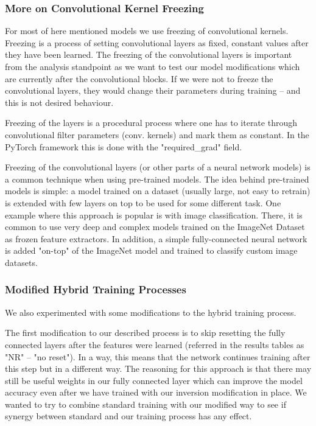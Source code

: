 \documentclass[b5paper]{book}
\begin{document}
\subsubsection{More on Convolutional Kernel Freezing}

For most of here mentioned models we use freezing of convolutional kernels. Freezing is a process of setting convolutional layers as fixed, constant values after they have been learned. The freezing of the convolutional layers is important from the analysis standpoint as we want to test our model modifications which are currently after the convolutional blocks. If we were not to freeze the convolutional layers, they would change their parameters during training -- and this is not desired behaviour. 

Freezing of the layers is a procedural process where one has to iterate through convolutional filter parameters (conv. kernels) and mark them as constant. In the PyTorch framework this is done with the "required\_grad" field.

Freezing of the convolutional layers (or other parts of a neural network models) is a common technique when using pre-trained models. The idea behind pre-trained models is simple: a model trained on a dataset (usually large, not easy to retrain) is extended with few layers on top to be used for some different task. One example where this approach is popular is with image classification. There, it is common to use very deep and complex models trained on the ImageNet Dataset as frozen feature extractors. In addition, a simple fully-connected neural network is added "on-top" of the ImageNet model and trained to classify custom image datasets.

\subsubsection{Modified Hybrid Training Processes}

We also experimented with some modifications to the hybrid training process.

The first modification to our described process is to skip resetting the fully connected layers after the features were learned (referred in the results tables as "NR" -- "no reset").  In a way, this means that the network continues training after this step but in a different way. The reasoning for this approach is that there may still be useful weights in our fully connected layer which can improve the model accuracy even after we have trained with our inversion modification in place. We wanted to try to combine standard training with our modified way to see if synergy between standard and our training process has any effect.
\end{document}
